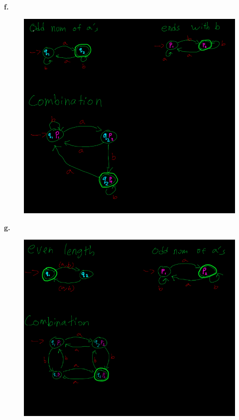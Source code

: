 \documentclass[letter]{article}
\theoremstyle{case}
\begin{document}
\textbf{f.}
\begin{figure}[h!]
	\includegraphics[scale=0.4]{4f.png}
\end{figure} 

\textbf{g.}
\begin{figure}[h!]
	\includegraphics[scale=0.4]{4g.png}
\end{figure}

\newpage
\end{document}
